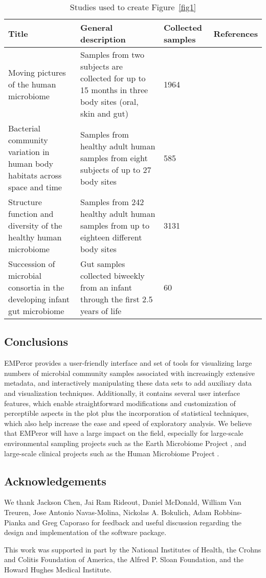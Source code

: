 \begin{sidewaystable}[htbp]
\centering
\caption{Studies used to create Figure~\ref{fig1}}
\label{tab1}
\begin{tabular}{m{7cm}m{10cm}MM}
\toprule
Title   & General description  & Collected samples & References  \\
\midrule
Moving pictures of the human microbiome & Samples from two subjects are collected for up to 15 months in three body sites (oral, skin and gut) & 1964  & \cite{RN85,RN82} \\
\midrule
Bacterial community variation in human body habitats across space and time & Samples from   healthy adult human samples from eight subjects of up to 27 body sites & 585   & \cite{RN4220} \rule{0pt}{3ex} \\
\midrule
Structure function and diversity of the healthy human microbiome & Samples from 242 healthy adult human samples from up to eighteen different body sites & 3131  & \cite{RN35} \rule{0pt}{3ex}\\
\midrule
Succession of microbial consortia in the developing infant gut microbiome & Gut samples collected biweekly from an infant through the first 2.5 years of life  & 60  & \cite{RN35}\rule{0pt}{3ex}\\
\bottomrule
\end{tabular}
\end{sidewaystable}

\subsection{Conclusions}
EMPeror provides a user\hyp{}friendly interface and set of tools for visualizing large numbers of microbial community samples associated with increasingly extensive metadata, and interactively manipulating these data sets to add auxiliary data and visualization techniques. Additionally, it contains several user interface features, which enable straightforward modifications and customization of perceptible aspects in the plot plus the incorporation of statistical techniques, which also help increase the ease and speed of exploratory analysis. We believe that EMPeror will have a large impact on the field, especially for large\hyp{}scale environmental sampling projects such as the Earth Microbiome Project \cite{RN10}, and large\hyp{}scale clinical projects such as the Human Microbiome Project \cite{RN35}.

\subsection{Acknowledgements}

We thank Jackson Chen, Jai Ram Rideout, Daniel McDonald, William Van Treuren, Jose Antonio Navas\hyp{}Molina, Nickolas A. Bokulich, Adam Robbins\hyp{}Pianka and Greg Caporaso for feedback and useful discussion regarding the design and implementation of the software package.
 
This work was supported in part by the National Institutes of Health, the Crohns and Colitis Foundation of America, the Alfred P. Sloan Foundation, and the Howard Hughes Medical Institute.
